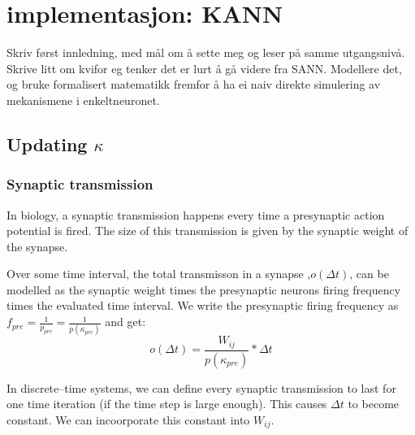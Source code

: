 %


\chapter{implementasjon: KANN}
	Skriv først innledning, med mål om å sette meg og leser på samme utgangsnivå.
	Skrive litt om kvifor eg tenker det er lurt å gå videre fra SANN.
	Modellere det, og bruke formalisert matematikk fremfor å ha ei naiv direkte simulering av mekanismene i enkeltneuronet.

	
	\section{Updating $\kappa$} %
		\subsection{Synaptic transmission}
			In biology, a synaptic transmission happens every time a presynaptic action potential is fired.
			The size of this transmission is given by the synaptic weight of the synapse.

			Over some time interval, the total transmisson in a synapse ,$o(\Delta t)$, can be modelled as the synaptic weight times the presynaptic neurons firing frequency times the evaluated time interval.
			We write the presynaptic firing frequency as $f_{pre} = \frac{1}{p_{pre}} = \frac{1}{p(\kappa_{pre})}$ and get:
			\begin{equation}
				\label{eqSynapticTransmission}
				o(\Delta t) = \frac{ W_{ij} }{ p(\kappa_{pre})} * \Delta t 
			\end{equation}

			In discrete--time systems, we can define every synaptic transmission to last for one time iteration (if the time step is large enough).  %
			This causes $\Delta t$ to become constant. We can incoorporate this constant into $W_{ij}$.

